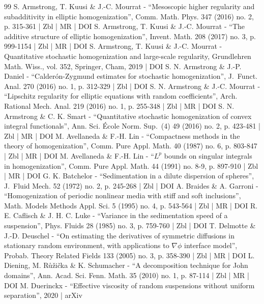 \begin{thebibliography}{99}
S. Armstrong, T. Kuusi \& J.-C. Mourrat - “Mesoscopic higher regularity and subadditivity in elliptic homogenization”, Comm. Math. Phys. 347 (2016) no. 2, p. 315-361 | Zbl | MR | DOI
S. Armstrong, T. Kuusi \& J.-C. Mourrat - “The additive structure of elliptic homogenization”, Invent. Math. 208 (2017) no. 3, p. 999-1154 | Zbl | MR | DOI
S. Armstrong, T. Kuusi \& J.-C. Mourrat - Quantitative stochastic homogenization and large-scale regularity, Grundlehren Math. Wiss., vol. 352, Springer, Cham, 2019 | DOI
S. N. Armstrong \& J.-P. Daniel - “Calderón-Zygmund estimates for stochastic homogenization”, J. Funct. Anal. 270 (2016) no. 1, p. 312-329 | Zbl | DOI
S. N. Armstrong \& J.-C. Mourrat - “Lipschitz regularity for elliptic equations with random coefficients”, Arch. Rational Mech. Anal. 219 (2016) no. 1, p. 255-348 | Zbl | MR | DOI
S. N. Armstrong \& C. K. Smart - “Quantitative stochastic homogenization of convex integral functionals”, Ann. Sci. École Norm. Sup. (4) 49 (2016) no. 2, p. 423-481 | Zbl | MR | DOI
M. Avellaneda \& F.-H. Lin - “Compactness methods in the theory of homogenization”, Comm. Pure Appl. Math. 40 (1987) no. 6, p. 803-847 | Zbl | MR | DOI
M. Avellaneda \& F.-H. Lin - “$L^p$ bounds on singular integrals in homogenization”, Comm. Pure Appl. Math. 44 (1991) no. 8-9, p. 897-910 | Zbl | MR | DOI
G. K. Batchelor - “Sedimentation in a dilute dispersion of spheres”, J. Fluid Mech. 52 (1972) no. 2, p. 245-268 | Zbl | DOI
A. Braides \& A. Garroni - “Homogenization of periodic nonlinear media with stiff and soft inclusions”, Math. Models Methods Appl. Sci. 5 (1995) no. 4, p. 543-564 | Zbl | MR | DOI
R. E. Caflisch \& J. H. C. Luke - “Variance in the sedimentation speed of a suspension”, Phys. Fluids 28 (1985) no. 3, p. 759-760 | Zbl | DOI
T. Delmotte \& J.-D. Deuschel - “On estimating the derivatives of symmetric diffusions in stationary random environment, with applications to $\nabla \phi $ interface model”, Probab. Theory Related Fields 133 (2005) no. 3, p. 358-390 | Zbl | MR | DOI
L. Diening, M. Růžička \& K. Schumacher - “A decomposition technique for John domains”, Ann. Acad. Sci. Fenn. Math. 35 (2010) no. 1, p. 87-114 | Zbl | MR | DOI
M. Duerinckx - “Effective viscosity of random suspensions without uniform separation”, 2020 | arXiv

\end{thebibliography}
